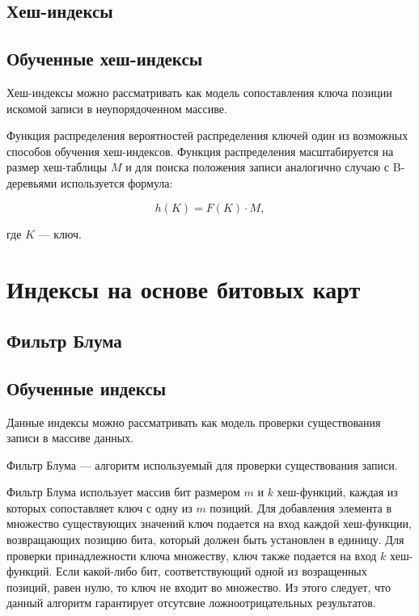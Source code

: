 \subsection{Хеш-индексы}


\subsection{Обученные хеш-индексы}

Хеш-индексы можно рассматривать как модель сопоставления ключа позиции
искомой записи в неупорядоченном массиве.


Функция распределения вероятностей распределения ключей  один из возможных
способов обучения хеш-индексов. Функция распределения масштабируется на размер
хеш-таблицы $M$ и для поиска положения записи аналогично случаю с B-деревьями
используется формула:

\begin{equation}
    h(K) = F(K) \cdot M,
\end{equation}

где $K$ --- ключ.


\section{Индексы на основе битовых карт}

\subsection{Фильтр Блума}


\subsection{Обученные индексы}

Данные индексы можно рассматривать как модель проверки существования записи в
массиве данных.

Фильтр Блума --- алгоритм используемый для проверки существования записи.

Фильтр Блума использует массив бит размером $m$ и $k$ хеш-функций, каждая из
которых сопоставляет ключ с одну из $m$ позиций. Для добавления элемента в
множество существующих значений ключ подается на вход каждой хеш-функции,
возвращающих позицию бита, который должен быть установлен в единицу. Для проверки
принадлежности ключа множеству, ключ также подается на вход $k$ хеш-функций.
Если какой-либо бит, соответствующий одной из возращенных позиций, равен нулю,
то ключ не входит во множество. Из этого следует, что данный алгоритм гарантирует
отсутсвие ложноотрицательных результатов.


